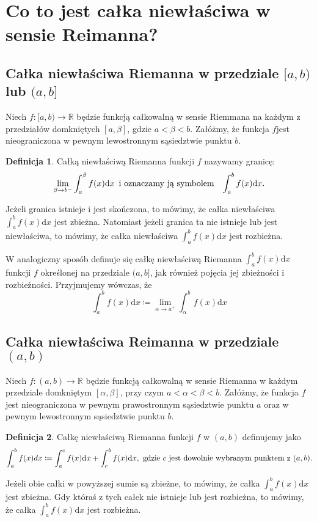\documentclass{article}
\theoremstyle{definition}
\newtheorem{definition}{Definicja}[section]
\theoremstyle{case}
\begin{document}
\section{Co to jest całka niewłaściwa w sensie Reimanna?}

\subsection{Całka niewłaściwa Riemanna w przedziale $[a,b)$ lub $(a,b]$}
Niech ${f \colon [a,b) \to \mathbb{R}}$ będzie funkcją całkowalną w sensie Riemmana
na każdym z przedziałów domkniętych ${[a,\beta]}$,
gdzie $a < \beta < b$.
Załóżmy, że funkcja $f$jest nieograniczona w pewnym lewostronnym sąsiedztwie punktu $b$.
\begin{definition}
	\label{def.1}
	Całką niewłaściwą Riemanna funkcji $f$ nazywamy granicę:
	\begin{equation*}
		\lim_{\beta \to b^-} \int _a ^{\beta} f(x) \mathrm d x
		\textnormal{\enskip i oznaczamy ją symbolem \enskip}
		\int_a^b f(x) \mathrm d x
		\textnormal{.}
	\end{equation*}
\end{definition}

Jeżeli granica istnieje i jest skończona, to mówimy,
że całka niewłaściwa ${\int_a^b f(x) \mathrm d x }$ jest zbieżna.
Natomiast jeżeli granica ta nie istnieje lub jest niewłaściwa, to mówimy,
że całka niewłaściwa ${\int_a^b f(x) \mathrm d x}$ jest rozbieżna.

W analogiczny sposób definuje się całkę niewłaściwą Riemanna
${\int_a^b f(x) \mathrm d x}$ funkcji $f$ określonej na przedziale ${(a,b]}$,
jak również pojęcia jej zbieżności i rozbieżności.
Przyjmujemy wówczas, że
\begin{equation*}
\int_a^b f(x) \mathrm d x \coloneqq \lim_{\alpha \to a^+} \int_{\alpha}^b f(x) \mathrm d x
\end{equation*}

\subsection{Całka niewłaściwa Reimanna w przedziale $(a,b)$}
Niech ${f \colon (a, b) \to \mathbb{R}}$ będzie funkcją całkowalną w sensie Riemanna
w każdym przedziale domkniętym $[\alpha,\beta]$, przy czym $a < \alpha < \beta < b$.
Załóżmy, że funkcja $f$ jest nieograniczona w pewnym prawostronnym sąsiedztwie punktu $a$ oraz
w pewnym lewostronnym sąsiedztwie punktu $b$.
\begin{definition}
	\label{def.2}
	Całkę niewłaściwą Riemanna funkcji $f$ w $(a,b)$ definujemy jako
	\begin{equation*}
		\int_a^b f(x)dx
		\coloneqq
		\int_a^c f(x) \mathrm d x + \int_c^b f(x) \mathrm d x
		\textnormal{,\enskip gdzie $c$ jest dowolnie wybranym punktem z $(a,b)$.}
	\end{equation*}
\end{definition}
Jeżeli obie całki w powyższej sumie są zbieżne, to mówimy,
że całka $\int_a^b f(x) \mathrm d x$ jest zbieżna.
Gdy któraś z tych całek nie istnieje lub jest rozbieżna, to mówimy,
że całka $\int_a^b f(x) \mathrm d x$ jest rozbieżna.
\end{document}
